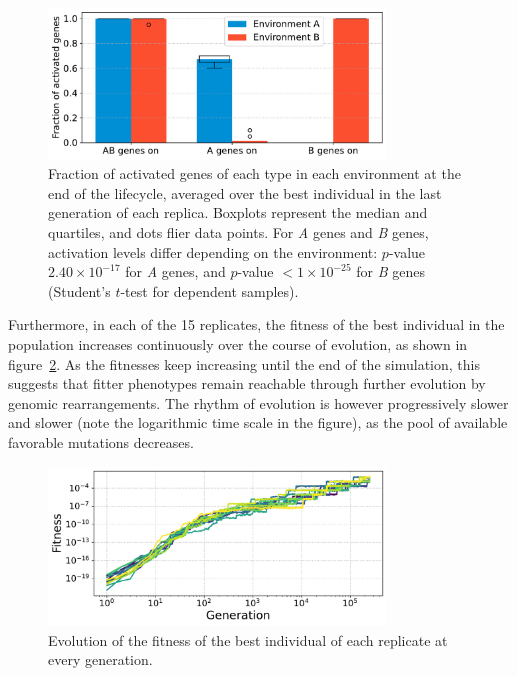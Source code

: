 \begin{figure}[H]
  \centering
\includegraphics[width=0.8\textwidth]{alife/img/mean_activation.pdf}
\caption[Fraction of activated genes of each type at the end of evolution in the simple model]{Fraction of activated genes of each type in each environment at the end of the lifecycle, averaged over the best individual in the last generation of each replica.
  Boxplots represent the median and quartiles, and dots flier data points.
  For \emph{A} genes and \emph{B} genes, activation levels differ depending on the environment: $p$-value $2.40\times10^{-17}$ for \emph{A} genes, and $p$-value $<1\times10^{-25}$ for \emph{B} genes (Student's $t$-test for dependent samples).}
  \label{fig:alife:mean_activ}
\end{figure}

Furthermore, in each of the 15 replicates, the fitness of the best individual in the population increases continuously over the course of evolution, as shown in figure~\ref{fig:alife:fitnesses}.
As the fitnesses keep increasing until the end of the simulation, this suggests that fitter phenotypes remain reachable through further evolution by genomic rearrangements.
The rhythm of evolution is however progressively slower and slower (note the logarithmic time scale in the figure), as the pool of available favorable mutations decreases.

\begin{figure}[H]
  \centering
  \includegraphics[width=0.8\textwidth]{alife/img/all_fitness.pdf}
  \caption[Fitness of every replicate during evolution in the simple model]{Evolution of the fitness of the best individual of each replicate at every generation.}
  \label{fig:alife:fitnesses}
\end{figure}

